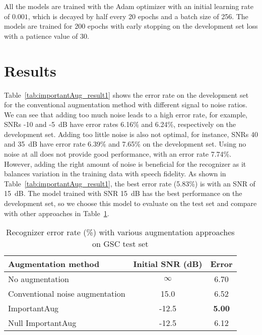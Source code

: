 \documentclass{article}
\begin{document}
All the models are trained with the Adam optimizer with an initial learning rate of $0.001$, which is decayed  by half every 20 epochs and a batch size of 256. The models are trained for 200 epochs with early stopping on the development set loss with a patience value of 30.


\section{Results}
Table~\ref{tab:importantAug_result1} shows the error rate on the development set for the conventional augmentation method with different signal to noise ratios. We can see that adding too much noise leads to a high error rate, for example, SNRs -10 and -5~dB have error rates 6.16\% and 6.24\%, respectively on the development set. Adding too little noise is also not optimal, for instance, SNRs 40 and 35~dB have error rate 6.39\% and 7.65\% on the development set. Using no noise at all does not provide good performance, with an error rate 7.74\%. However, adding the right amount of noise is beneficial for the recognizer as it balances variation in the training data with speech fidelity. As shown in Table~\ref{tab:importantAug_result1}, the best error rate (5.83\%) is with an SNR of 15~dB. The model trained with SNR 15~dB has the best performance on the development set, so we choose this model to evaluate on the test set and compare with other approaches in Table~\ref{tab:importantAug_result2}. 

\begin{table}
  \caption{Recognizer error rate (\%) with various augmentation approaches on GSC test set} \label{tab:importantAug_result2}
  \begin{center}
\begin{tabular}{lcc}
    \toprule
      Augmentation method & Initial SNR (dB) & Error \\
     \midrule
     No augmentation & $\infty$  & 6.70 \\
      Conventional noise augmentation & 15.0 & 6.52  \\
      ImportantAug & -12.5 & \textbf{5.00} \\
      Null ImportantAug & -12.5 & 6.12 \\
      \bottomrule
    \end{tabular}
  \end{center}
\end{table}
\end{document}
